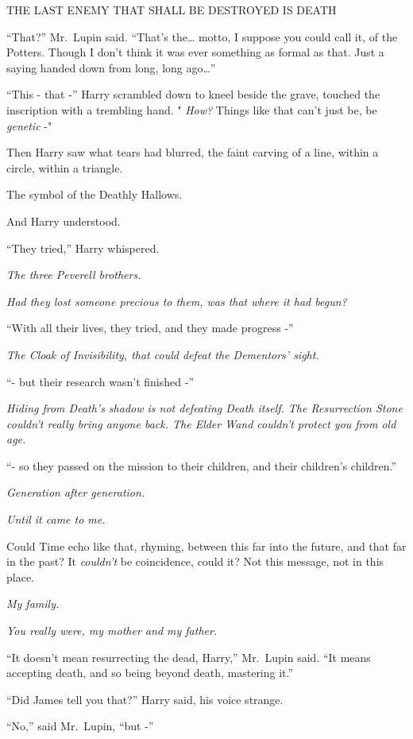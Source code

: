THE LAST ENEMY THAT SHALL BE DESTROYED IS DEATH

``That?'' Mr.~Lupin said. ``That's the\ldots{} motto, I suppose you
could call it, of the Potters. Though I don't think it was ever
something as formal as that. Just a saying handed down from long, long
ago\ldots{}''

``This - that -'' Harry scrambled down to kneel beside the grave,
touched the inscription with a trembling hand. " \emph{How?} Things like
that can't just be, be \emph{genetic} -"

Then Harry saw what tears had blurred, the faint carving of a line,
within a circle, within a triangle.

The symbol of the Deathly Hallows.

And Harry understood.

``They tried,'' Harry whispered.

\emph{The three Peverell brothers.}

\emph{Had they lost someone precious to them, was that where it had
begun?}

``With all their lives, they tried, and they made progress -''

\emph{The Cloak of Invisibility, that could defeat the Dementors'
sight.}

``- but their research wasn't finished -''

\emph{Hiding from Death's shadow is not defeating Death itself. The
Resurrection Stone couldn't really bring anyone back. The Elder Wand
couldn't protect you from old age.}

``- so they passed on the mission to their children, and their
children's children.''

\emph{Generation after generation.}

\emph{Until it came to me.}

Could Time echo like that, rhyming, between this far into the future,
and that far in the past? It \emph{couldn't} be coincidence, could it?
Not this message, not in this place.

\emph{My family.}

\emph{You really were, my mother and my father.}

``It doesn't mean resurrecting the dead, Harry,'' Mr.~Lupin said. ``It
means accepting death, and so being beyond death, mastering it.''

``Did James tell you that?'' Harry said, his voice strange.

``No,'' said Mr.~Lupin, ``but -''

